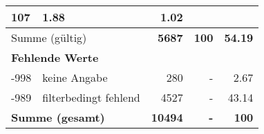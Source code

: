 \begin{longtable}{lXrrr}
       \num{107} &
       \num[round-mode=places,round-precision=2]{1,88} &
         \num[round-mode=places,round-precision=2]{1,02} \\
     \midrule
     \multicolumn{2}{l}{Summe (gültig)} &
       \textbf{\num{5687}} &
     \textbf{100} &
       \textbf{\num[round-mode=places,round-precision=2]{54,19}} \\
     \multicolumn{5}{l}{\textbf{Fehlende Werte}}\\
       -998 &
       keine Angabe &
         \num{280} &
        - &
         \num[round-mode=places,round-precision=2]{2,67} \\
       -989 &
       filterbedingt fehlend &
         \num{4527} &
        - &
         \num[round-mode=places,round-precision=2]{43,14} \\
     \midrule
     \multicolumn{2}{l}{\textbf{Summe (gesamt)}} &
          \textbf{\num{10494}} &
        \textbf{-} &
        \textbf{100} \\
     \bottomrule
     \end{longtable}
     
